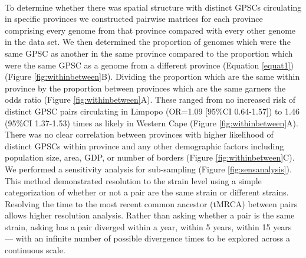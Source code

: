 \documentclass{article}
\begin{document}
\\To determine whether there was spatial structure with distinct GPSCs circulating in specific provinces we constructed pairwise matrices for each province comprising every genome from that province compared with every other genome in the data set. We then determined the proportion of genomes which were the same GPSC as another in the same province compared to the proportion which were the same GPSC as a genome from a different province (Equation \ref{equat1})(Figure \ref{fig:withinbetween}B). Dividing the proportion which are the same within province by the proportion between provinces which are the same garners the odds ratio (Figure \ref{fig:withinbetween}A). These ranged from no increased risk of distinct GPSC pairs circulating in Limpopo (OR=1.09 [95\%CI 0.64-1.57]) to 1.46 (95\%CI 1.37-1.53) times as likely in Western Cape (Figure \ref{fig:withinbetween}A). There was no clear correlation between provinces with higher likelihood of distinct GPSCs within province and any other demographic factors including population size, area, GDP, or number of borders (Figure \ref{fig:withinbetween}C). We performed a sensitivity analysis for sub-sampling (Figure \ref{fig:sensanalysis}).
\\This method demonstrated resolution to the strain level using a simple categorization of whether or not a pair are the same strain or different strains. Resolving the time to the most recent common ancestor (tMRCA) between pairs allows higher resolution analysis. Rather than asking whether a pair is the same strain, asking has a pair diverged within a year, within 5 years, within 15 years --- with an infinite number of possible divergence times to be explored across a continuous scale. 
\end{document}
